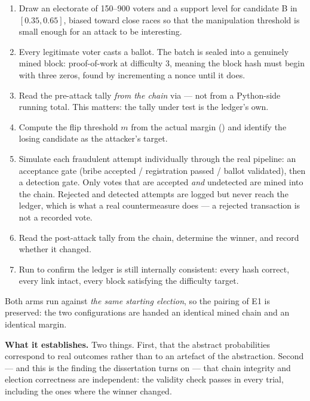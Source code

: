 \begin{enumerate}[leftmargin=1.7em,itemsep=2pt]
\item Draw an electorate of 150--900 voters and a support level for
      candidate B in $[0.35, 0.65]$, biased toward close races so that
      the manipulation threshold is small enough for an attack to be
      interesting.
\item Every legitimate voter casts a ballot. The batch is sealed into a
      genuinely mined block: proof-of-work at difficulty 3, meaning the
      block hash must begin with three zeros, found by incrementing a
      nonce until it does.
\item Read the pre-attack tally \emph{from the chain} via
       --- not from a Python-side running total.
      This matters: the tally under test is the ledger's own.
\item Compute the flip threshold $m$ from the actual margin
      () and identify the losing candidate as the
      attacker's target.
\item Simulate each fraudulent attempt individually through the real
      pipeline: an acceptance gate (bribe accepted / registration
      passed / ballot validated), then a detection gate. Only votes
      that are accepted \emph{and} undetected are mined into the chain.
      Rejected and detected attempts are logged but never reach the
      ledger, which is what a real countermeasure does --- a rejected
      transaction is not a recorded vote.
\item Read the post-attack tally from the chain, determine the winner,
      and record whether it changed.
\item Run  to confirm the ledger is still
      internally consistent: every hash correct, every link intact,
      every block satisfying the difficulty target.
\end{enumerate}

Both arms run against \emph{the same starting election}, so the pairing
of E1 is preserved: the two configurations are handed an identical
mined chain and an identical margin.

\textbf{What it establishes.} Two things. First, that the abstract
probabilities correspond to real outcomes rather than to an artefact of
the abstraction. Second --- and this is the finding the dissertation
turns on --- that chain integrity and election correctness are
independent: the validity check passes in every trial, including the
ones where the winner changed.

